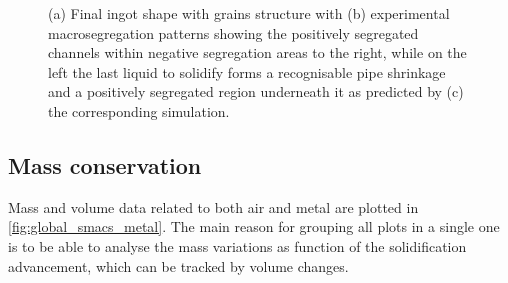 \begin{figure}[htbp]
\caption{(a) Final ingot shape with grains structure with (b) experimental macrosegregation patterns showing the positively segregated 
channels within negative segregation areas to the right, while on the left the last liquid to solidify 
forms a recognisable pipe shrinkage and a positively segregated region underneath it as predicted by (c) the corresponding simulation.} 
\label{fig:smacs_planche}
\end{figure}



\subsection{Mass conservation}


Mass and volume data related to both air and metal are plotted in \cref{fig:global_smacs_metal}. 
The main reason for grouping all plots in a single one is to be able to analyse the mass variations as function of the solidification advancement, which can be tracked
by volume changes.

